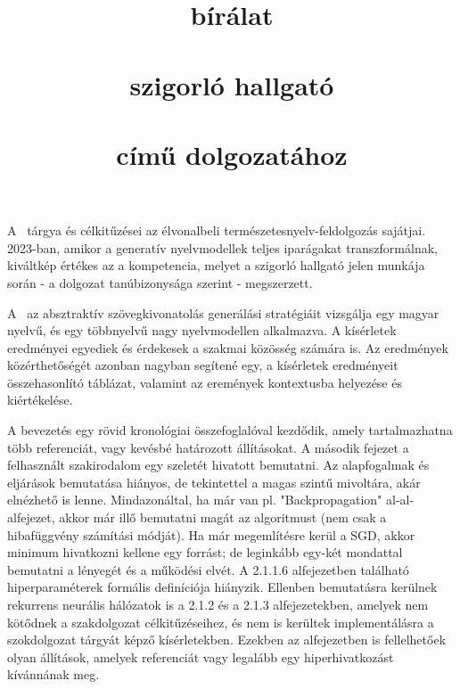 \documentclass[a4paper,12pt]{article}
\title{\Dolgozattipus{} bírálat \bigskip \\[0.2em]\large{\textbf{\jelolt} \\szigorló \kepzes{} hallgató \bigskip \\ \textbf{\dolgozatcim} \\ című dolgozatához}}
\author{}
\date{}
\begin{document}
\maketitle\vspace{-2cm}
A \dolgozattipus  ~tárgya és célkitűzései az élvonalbeli természetesnyelv-feldolgozás sajátjai. 2023-ban, amikor a generatív nyelvmodellek teljes iparágakat transzformálnak, kiváltkép értékes az a kompetencia, melyet a szigorló hallgató jelen munkája során - a dolgozat tanúbizonysága szerint - megszerzett.

A \dolgozattipus ~az absztraktív szövegkivonatolás generálási stratégiáit vizsgálja egy magyar nyelvű, és egy többnyelvű nagy nyelvmodellen alkalmazva. A kísérletek eredményei egyediek és érdekesek a szakmai közösség számára is. Az eredmények közérthetőségét azonban nagyban segítené egy, a kísérletek eredményeit összehasonlító táblázat, valamint az eremények kontextusba helyezése és kiértékelése.

A bevezetés egy rövid kronológiai összefoglalóval kezdődik, amely tartalmazhatna több referenciát, vagy kevésbé határozott állításokat. A második fejezet a felhasznált szakirodalom egy szeletét hivatott bemutatni. Az alapfogalmak és eljárások bemutatása hiányos, de tekintettel a \dolgozattipus magas szintű mivoltára, akár elnézhető is lenne. Mindazonáltal, ha már van pl. "Backpropagation" al-al-alfejezet, akkor már illő bemutatni magát az algoritmust (nem csak a hibafüggvény számítási módját). Ha már megemlítésre kerül a SGD, akkor minimum hivatkozni kellene egy forrást; de leginkább egy-két mondattal bemutatni a lényegét és a működési elvét. A 2.1.1.6 alfejezetben található hiperparaméterek formális definíciója hiányzik. Ellenben bemutatásra kerülnek rekurrens neurális hálózatok is a 2.1.2 és a 2.1.3 alfejezetekben, amelyek nem kötődnek a szakdolgozat célkitűzéseihez, és nem is kerültek implementálásra a szokdolgozat tárgyát képző kísérletekben. Ezekben az alfejezetben is fellelhetőek olyan állítások, amelyek referenciát vagy legalább egy hiperhivatkozást kívánnának meg.
\end{document}
